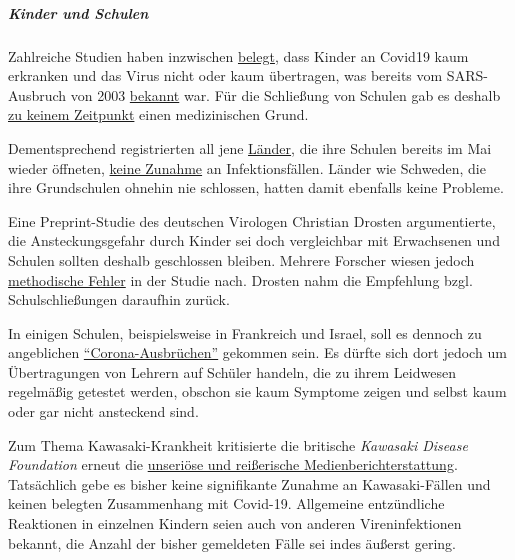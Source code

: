 \hypertarget{kinder-und-schulen-1}{%
\subparagraph{\texorpdfstring{\textbf{Kinder und
Schulen}}{Kinder und Schulen}}\label{kinder-und-schulen-1}}

Zahlreiche Studien haben inzwischen
\href{https://thehill.com/opinion/education/500349-science-says-open-the-schools}{belegt},
dass Kinder an Covid19 kaum erkranken und das Virus nicht oder kaum
übertragen, was bereits vom SARS-Ausbruch von 2003
\href{https://www.thelancet.com/journals/lanchi/article/PIIS2352-4642(20)30095-X/fulltext}{bekannt}
war. Für die Schließung von Schulen gab es deshalb
\href{https://infekt.ch/2020/04/schulen-schliessen-hilfreich-oder-nicht/}{zu
keinem Zeitpunkt} einen medizinischen Grund.

Dementsprechend registrierten all jene
\href{https://www.reuters.com/article/us-health-coronavirus-denmark-reopening/opening-schools-in-denmark-did-not-worsen-outbreak-data-shows-idUSKBN2341N7}{Länder},
die ihre Schulen bereits im Mai wieder öffneten,
\href{https://www.cgdev.org/blog/back-school-tracking-covid-cases-schools-reopen}{keine
Zunahme} an Infektionsfällen. Länder wie Schweden, die ihre Grundschulen
ohnehin nie schlossen, hatten damit ebenfalls keine Probleme.

Eine Preprint-Studie des deutschen Virologen Christian Drosten
argumentierte, die Ansteckungsgefahr durch Kinder sei doch vergleichbar
mit Erwachsenen und Schulen sollten deshalb geschlossen bleiben. Mehrere
Forscher wiesen jedoch
\href{https://www.nau.ch/news/europa/coronavirus-forscher-drangen-drosten-zum-ruckzug-der-kinder-studie-65714012}{methodische
Fehler} in der Studie nach. Drosten nahm die Empfehlung bzgl.
Schulschließungen daraufhin zurück.

In einigen Schulen, beispielsweise in Frankreich und Israel, soll es
dennoch zu angeblichen
\href{https://www.npr.org/sections/coronavirus-live-updates/2020/06/03/868507524/israel-orders-schools-to-close-when-covid-19-cases-are-discovered}{``Corona-Ausbrüchen''}
gekommen sein. Es dürfte sich dort jedoch um Übertragungen von Lehrern
auf Schüler handeln, die zu ihrem Leidwesen regelmäßig getestet werden,
obschon sie kaum Symptome zeigen und selbst kaum oder gar nicht
ansteckend sind.

Zum Thema Kawasaki-Krankheit kritisierte die britische \emph{Kawasaki
Disease Foundation} erneut die
\href{https://www.societi.org.uk/kawasaki-disease-and-covid-19/}{unseriöse
und reißerische Medienberichterstattung}. Tatsächlich gebe es bisher
keine signifikante Zunahme an Kawasaki-Fällen und keinen belegten
Zusammenhang mit Covid-19. Allgemeine entzündliche Reaktionen in
einzelnen Kindern seien auch von anderen Vireninfektionen bekannt, die
Anzahl der bisher gemeldeten Fälle sei indes äußerst gering.

